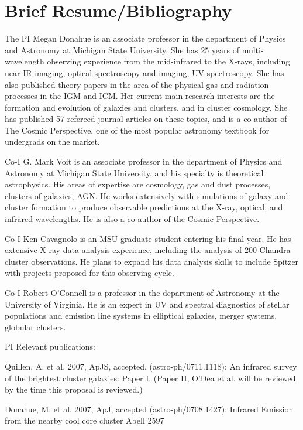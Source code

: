 \documentclass[letterpaper,12pt]{article}
\begin{document}
\section{Brief Resume/Bibliography}

The PI Megan Donahue is an associate professor in the department
of Physics and Astronomy at Michigan State University. She
has 25 years of multi-wavelength observing experience 
from the mid-infrared to the X-rays, including near-IR imaging, optical 
spectroscopy and imaging, UV spectroscopy. She has also published theory papers
in the area of the physical gas and radiation processes in the IGM and ICM.
Her current main research interests are the formation and evolution of galaxies and clusters,
and in cluster cosmology. She has published 57 refereed journal articles on
these topics, and is a co-author of The Cosmic Perspective, one of the 
most popular astronomy textbook for undergrads on the market. 

Co-I G. Mark Voit is an associate professor in the department
of Physics and Astronomy at Michigan State University, and his specialty
is theoretical astrophysics. His areas of expertise are cosmology, 
gas and dust processes, clusters of galaxies, AGN. He works extensively with
simulations of galaxy and cluster formation to produce observable predictions
at the X-ray, optical, and infrared wavelengths. He is also a co-author of the
Cosmic Perspective.

Co-I Ken Cavagnolo is an MSU graduate student entering his final year. He has 
extensive X-ray data analysis experience, including the analysis of 200 Chandra
cluster observations. He plans to expand his data analysis skills to include 
Spitzer with projects proposed for this observing cycle.

Co-I Robert O'Connell is a professor in the department of Astronomy at 
the University of Virginia. He is an expert in UV and spectral diagnostics
of stellar populations and emission line systems in elliptical galaxies,
merger systems, globular clusters.

PI Relevant publications:

Quillen, A. et al. 2007, ApJS, accepted. (astro-ph/0711.1118): An infrared survey
of the brightest cluster galaxies: Paper I. (Paper II, O'Dea et al. will be reviewed 
by the time this proposal is reviewed.)

Donahue, M. et al. 2007, ApJ, accepted (astro-ph/0708.1427): Infrared Emission from the 
nearby cool core cluster Abell 2597
\end{document}

